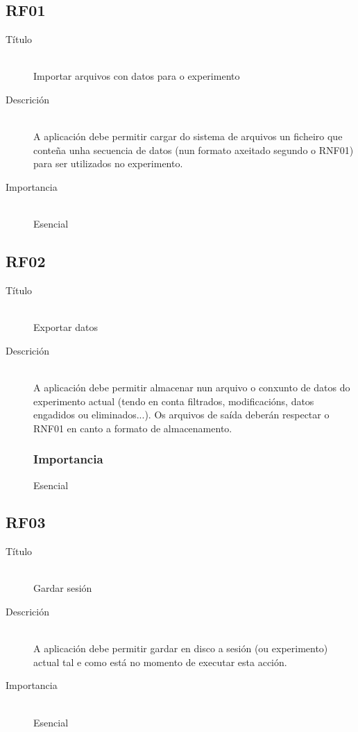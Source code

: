 \subsection*{RF01}
\begin{description}
\item[Título] \hfill \\
Importar arquivos con datos para o experimento
\item[Descrición] \hfill \\
A aplicación debe permitir cargar do sistema de arquivos un ficheiro que conteña unha secuencia de datos (nun formato axeitado segundo o RNF01) para ser utilizados no experimento.
\item[Importancia] \hfill \\
Esencial
\end{description}

\subsection*{RF02}
\begin{description}
\item[Título] \hfill \\
Exportar datos
\item[Descrición] \hfill \\
A aplicación debe permitir almacenar nun arquivo o conxunto de datos do experimento actual (tendo en conta filtrados, modificacións, datos engadidos ou eliminados...). Os arquivos de saída deberán respectar o RNF01 en canto a formato de almacenamento.
\subsubsection{Importancia}
Esencial
\end{description}

\subsection*{RF03}
\begin{description}
\item[Título] \hfill \\
Gardar sesión
\item[Descrición] \hfill \\
A aplicación debe permitir gardar en disco a sesión (ou experimento) actual tal e como está no momento de executar esta acción.
\item[Importancia] \hfill \\
Esencial
\end{description}

